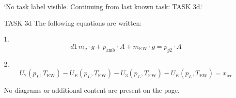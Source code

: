 `No task label visible. Continuing from last known task: TASK 3d.`

TASK 3d  
The following equations are written:

1.  
\[
d1 \, m_{g} \cdot g + p_{\text{amb}} \cdot A + m_{\text{EW}} \cdot g = p_{g2} \cdot A
\]

2.  
\[
U_2(p_{L}, T_{\text{EW}}) - U_E(p_{L}, T_{\text{EW}}) - U_3(p_{L}, T_{\text{EW}}) - U_E(p_{L}, T_{\text{EW}}) = x_{\text{ice}}
\]  

No diagrams or additional content are present on the page.